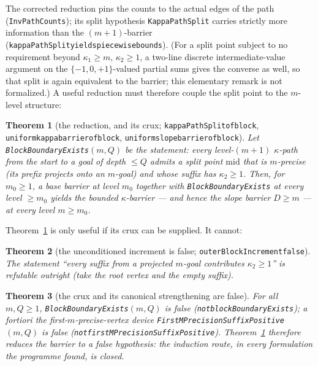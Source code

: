 \documentclass[11pt]{amsart}
\newtheorem{theorem}{Theorem}[section]
\theoremstyle{definition}
\theoremstyle{remark}
\newcommand{\lean}[1]{{\def\_{\textunderscore\allowbreak}\texttt{#1}}}
\begin{document}
The corrected reduction pins the counts to the actual edges of the path
(\lean{InvPathCounts}); its split hypothesis \lean{KappaPathSplit} carries
strictly more information than the $(m{+}1)$-barrier
(\lean{kappaPathSplit\_yields\_piecewise\_bounds}).  (For a split point
subject to no requirement beyond $\kappa_1 \ge m$, $\kappa_2 \ge 1$, a
two-line discrete intermediate-value argument on the $\{-1,0,+1\}$-valued
partial sums gives the converse as well, so that split is again equivalent
to the barrier; this elementary remark is not formalized.)  A useful
reduction must therefore couple the split point to the $m$-level structure:

\begin{theorem}[the reduction, and its crux;
\lean{kappaPathSplit\_of\_block}, \lean{uniform\_kappa\_barrier\_of\_block},
\lean{uniform\_slope\_barrier\_of\_block}]
\label{thm:split}
Let \lean{BlockBoundaryExists}$(m,Q)$ be the statement: every level-$(m{+}1)$
$\kappa$-path from the start to a goal of depth $\le Q$ admits a split point
$\mathrm{mid}$ that is $m$-precise (its prefix projects onto an $m$-goal)
and whose suffix has $\kappa_2 \ge 1$.  Then, for $m_0 \ge 1$, a base
barrier at level $m_0$ together with \lean{BlockBoundaryExists} at every
level $\ge m_0$ yields the
bounded $\kappa$-barrier --- and hence the slope barrier $D \ge m$ --- at
every level $m \ge m_0$.
\end{theorem}

Theorem~\ref{thm:split} is only useful if its crux can be supplied.  It
cannot:

\begin{theorem}[the unconditioned increment is false; \lean{outerBlockIncrement\_false}]
The statement ``every suffix from a projected $m$-goal contributes
$\kappa_2 \ge 1$'' is refutable outright (take the root vertex and the empty
suffix).
\end{theorem}

\begin{theorem}[the crux and its canonical strengthening are false]
\label{thm:ladder}
For all $m, Q \ge 1$, \lean{BlockBoundaryExists}$(m,Q)$ is false
(\lean{not\_blockBoundaryExists}); a fortiori the first-$m$-precise-vertex
device \lean{FirstMPrecisionSuffixPositive}$(m,Q)$ is false
(\lean{not\_firstMPrecisionSuffixPositive}).  Theorem~\ref{thm:split}
therefore reduces the barrier to a false hypothesis: the induction route, in
every formulation the programme found, is closed.
\end{theorem}
\end{document}
